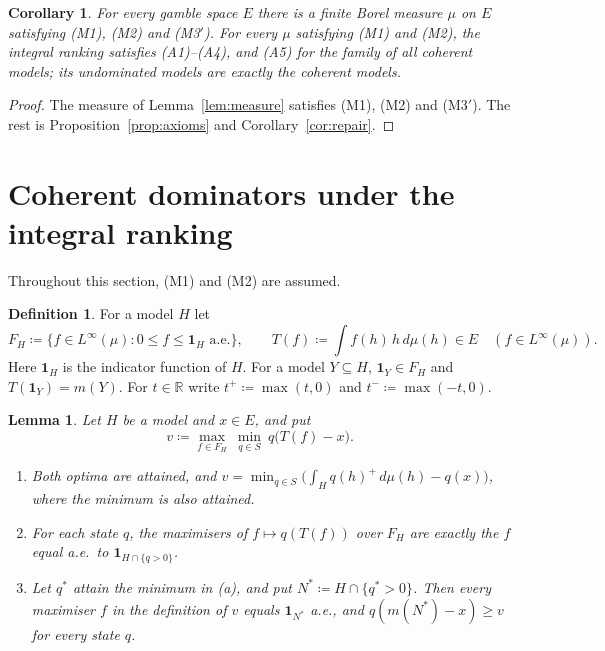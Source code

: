 \documentclass[11pt]{article}
\newcommand{\R}{\mathbb{R}}
\newcommand{\one}{\mathbf{1}}
\theoremstyle{plain}
\newtheorem{lemma}[theorem]{Lemma}
\newtheorem{corollary}[theorem]{Corollary}
\theoremstyle{definition}
\newtheorem{definition}[theorem]{Definition}
\theoremstyle{remark}
\begin{document}
\begin{corollary}\label{cor:existence}
For every gamble space $E$ there is a finite Borel measure $\mu$ on $E$ satisfying (M1), (M2)
and (M3$'$). For every $\mu$ satisfying (M1) and (M2), the integral ranking satisfies
(A1)--(A4), and (A5) for the family of all coherent models; its undominated models are exactly
the coherent models.
\end{corollary}

\begin{proof}
The measure of Lemma~\ref{lem:measure} satisfies (M1), (M2) and (M3$'$). The rest is
Proposition~\ref{prop:axioms} and Corollary~\ref{cor:repair}.
\end{proof}

\section{Coherent dominators under the integral ranking}\label{sec:repair}

Throughout this section, (M1) and (M2) are assumed.

\begin{definition}\label{def:weighted}
For a model $H$ let
\[
  F_H\coloneqq\{f\in L^\infty(\mu):0\le f\le\one_H\text{ a.e.}\},\qquad
  T(f)\coloneqq\int f(h)\,h\,d\mu(h)\in E\quad(f\in L^\infty(\mu)).
\]
Here $\one_H$ is the indicator function of $H$. For a model $Y\subseteq
H$, $\one_Y\in F_H$ and $T(\one_Y)=m(Y)$. For $t\in\R$ write $t^+\coloneqq\max(t,0)$ and
$t^-\coloneqq\max(-t,0)$.
\end{definition}

\begin{lemma}\label{lem:minimax}
Let $H$ be a model and $x\in E$, and put
\[
  v\coloneqq\max_{f\in F_H}\ \min_{q\in S}\ q\bigl(T(f)-x\bigr).
\]
\begin{enumerate}[label=(\alph*)]
  \item Both optima are attained, and $v=\min_{q\in S}\bigl(\int_Hq(h)^+\,d\mu(h)-q(x)\bigr)$,
  where the minimum is also attained.
  \item For each state $q$, the maximisers of $f\mapsto q(T(f))$ over $F_H$ are exactly the
  $f$ equal a.e.\ to $\one_{H\cap\{q>0\}}$.
  \item Let $q^\ast$ attain the minimum in (a), and put $N^\ast\coloneqq H\cap\{q^\ast>0\}$.
  Then every maximiser $f$ in the definition of $v$ equals $\one_{N^\ast}$ a.e., and
  $q(m(N^\ast)-x)\ge v$ for every state $q$.
\end{enumerate}
\end{lemma}
\end{document}

